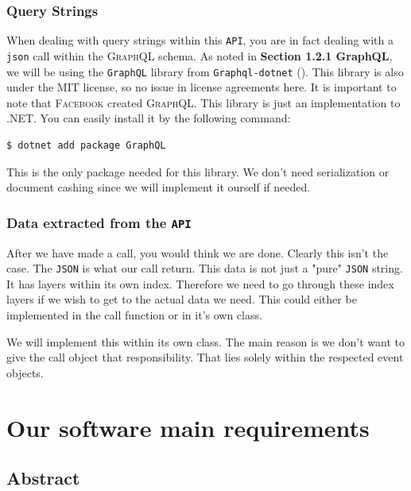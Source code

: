 \documentclass[10pt, a4paper]{memoir}
\numberwithin{equation}{section}
\theoremstyle{plain}
\theoremstyle{defp}
\theoremstyle{dotless}
\theoremstyle{definition}
\theoremstyle{dotless}
\theoremstyle{dotless}
\theoremstyle{defp}
\theoremstyle{defp}
\theoremstyle{be}          %
\theoremstyle{defp}
\newcommand\ttt[1]{\texttt{#1}}
\newcommand\tsc[1]{\textsc{#1}}
\begin{document}
\subsection{Query Strings}

When dealing with query strings within this \ttt{API}, you are in fact dealing with a \ttt{json} call within the \tsc{GraphQL} schema. As noted in \textbf{Section 1.2.1 GraphQL}, we will be using the \ttt{GraphQL} library from \ttt{Graphql-dotnet} (\cite{GQLdotnet}). This library is also under the \tsc{MIT} license, so no issue in license agreements here. It is important to note that \tsc{Facebook} created \tsc{GraphQL}. This library is just an implementation to \tsc{.NET}. You can easily install it by the following command:

\begin{verbatim}
$ dotnet add package GraphQL
\end{verbatim}

This is the only package needed for this library. We don't need serialization or document cashing since we will implement it ourself if needed. 

\subsection{Data extracted from the \ttt{API}}

After we have made a call, you would think we are done. Clearly this isn't the case. The \ttt{JSON} is what our call return. This data is not just a "pure" \ttt{JSON} string. It has layers within its own index. Therefore we need to go through these index layers if we wish to get to the actual data we need. This could either be implemented in the call function or in it's own class.

\medskip

We will implement this within its own class. The main reason is we don't want to give the call object that responsibility. That lies solely within the respected event objects. 

\newpage

\chapter{Our software main requirements}

\section*{Abstract}
\end{document}

